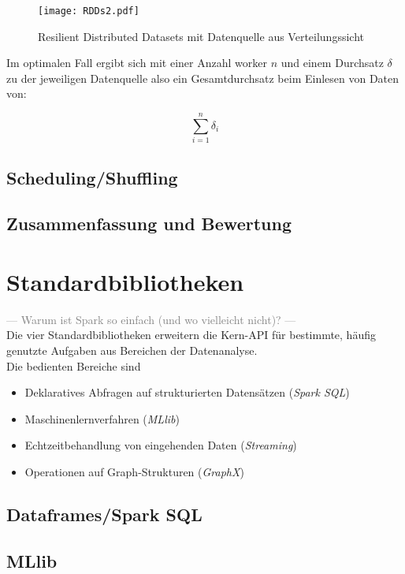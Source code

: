 \begin{figure}[ht!]
	\centering
  \texttt{[image: RDDs2.pdf]}
	\caption{Resilient Distributed Datasets mit Datenquelle aus Verteilungssicht}
	\label{fig:rdds2}
\end{figure}

Im optimalen Fall ergibt sich mit einer Anzahl \gls{worker} $n$ und einem Durchsatz $\delta$ zu der jeweiligen Datenquelle also ein Gesamtdurchsatz beim Einlesen von Daten von:

\begin{equation}
	\sum_{i=1}^{n} \delta_i
\end{equation}


\subsection{Scheduling/Shuffling}
\subsection{Zusammenfassung und Bewertung}

\section{Standardbibliotheken}
\textcolor{gray}{--- Warum ist Spark so einfach (und wo vielleicht nicht)? ---}\\
Die vier Standardbibliotheken erweitern die Kern-API für bestimmte, häufig genutzte Aufgaben aus Bereichen der Datenanalyse.\\

Die bedienten Bereiche sind
\begin{itemize}
	\item Deklaratives Abfragen auf strukturierten Datensätzen (\textit{Spark SQL})
	\item Maschinenlernverfahren (\textit{MLlib})
	\item Echtzeitbehandlung von eingehenden Daten (\textit{Streaming})
	\item Operationen auf Graph-Strukturen (\textit{GraphX})
\end{itemize}

\subsection{Dataframes/Spark SQL}
\subsection{MLlib}
